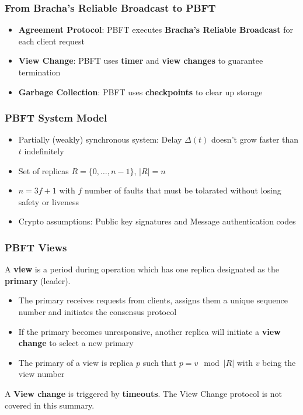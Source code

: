 \documentclass[12pt,A4]{extarticle}
\begin{document}
\subsubsection{From Bracha's Reliable Broadcast to PBFT}
\begin{itemize}
  \item \textbf{Agreement Protocol}: PBFT executes \textbf{Bracha's Reliable Broadcast} for each client request
  \item \textbf{View Change}: PBFT uses \textbf{timer} and \textbf{view changes} to guarantee termination
  \item \textbf{Garbage Collection}: PBFT uses \textbf{checkpoints} to clear up storage
\end{itemize}

\subsubsection{PBFT System Model}
\begin{itemize}
  \item Partially (weakly) synchronous system: Delay $\Delta(t)$ doesn't grow faster than $t$ indefinitely
  \item Set of replicas $R = \{0, \dots, n-1\}$, $|R| = n$
  \item $n = 3f + 1$ with $f$ number of faults that must be tolarated without losing safety or liveness
  \item Crypto assumptions: Public key signatures and Message authentication codes
\end{itemize}

\subsubsection{PBFT Views}
A \textbf{view} is a period during operation which has one replica designated as the \textbf{primary} (leader).
\begin{itemize}
  \item The primary receives requests from clients, assigns them a unique sequence number and initiates the consensus protocol
  \item If the primary becomes unresponsive, another replica will initiate a \textbf{view change} to select a new primary
  \item The primary of a view is replica $p$ such that $p = v \mod |R|$ with $v$ being the view number
\end{itemize}
A \textbf{View change} is triggered by \textbf{timeouts}. The View Change protocol is not covered in this summary.
\end{document}
